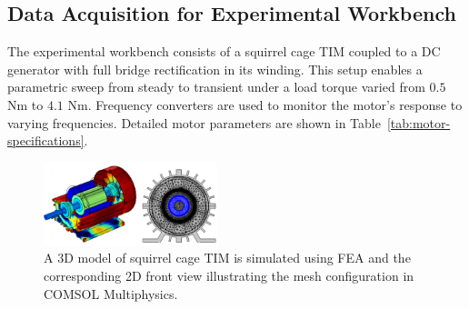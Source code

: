 \documentclass[a4paper,conference]{IEEEtran}
\begin{document}
\subsection{Data Acquisition for Experimental Workbench}
The experimental workbench consists of a squirrel cage TIM coupled to a DC generator with full bridge rectification in its winding. This setup enables a parametric sweep from steady to transient under a load torque varied from $0.5$ Nm to $4.1$ Nm. Frequency converters are used to monitor the motor's response to varying frequencies. Detailed motor parameters are shown in Table~\ref{tab:motor-specifications}.

\begin{figure}[b!]
    \centering
    \includegraphics[width=0.45\textwidth]{Figs/combine_images.png}
    \caption{A 3D model of squirrel cage TIM is simulated using FEA and the corresponding 2D front view illustrating the mesh configuration in COMSOL Multiphysics.}
    \label{fig:FEM}
\end{figure}
\end{document}
